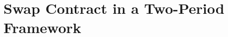 \documentclass[main.tex]{subfiles}
\begin{document}
    \section{Swap Contract in a Two-Period Framework}

    
\end{document}
